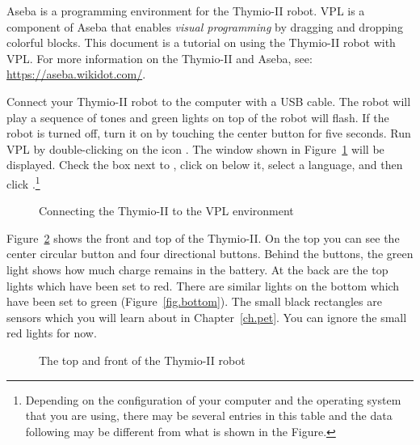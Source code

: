 
Aseba is a programming environment for the Thymio-II robot. VPL is a
component of Aseba that enables \emph{visual programming} by dragging
and dropping colorful blocks. This document is a tutorial on using the
Thymio-II robot with VPL. For more information on the Thymio-II and
Aseba, see: \url{https://aseba.wikidot.com/}.


Connect your Thymio-II robot to the computer with a USB cable. The robot
will play a sequence of tones and green lights on top of the robot will
flash. If the robot is turned off, turn it on by touching the center
button for five seconds. Run VPL by double-clicking on the icon
. The window shown in Figure~\ref{fig.connect} will be
displayed. Check the box next to , click on  below it, select a language, and then click
.\footnote{Depending on the configuration of your computer
and the operating system that you are using, there may be several
entries in this table and the data following  may be
different from what is shown in the Figure.}

\begin{figure}
\begin{center}
\caption{Connecting the Thymio-II to the VPL environment}\label{fig.connect}
\end{center}
\end{figure} 


Figure~\ref{fig.front} shows the front and top of the Thymio-II. On the
top you can see the center circular button and four directional buttons.
Behind the buttons, the green light shows how much charge remains in the
battery. At the back are the top lights which have been set to red.
There are similar lights on the bottom which have been set to green
(Figure~\ref{fig.bottom}). The small black rectangles are sensors which
you will learn about in Chapter~\ref{ch.pet}. You can ignore the small
red lights for now.

\begin{figure}
\begin{center}
\caption{The top and front of the Thymio-II robot}\label{fig.front}
\end{center}
\end{figure} 

